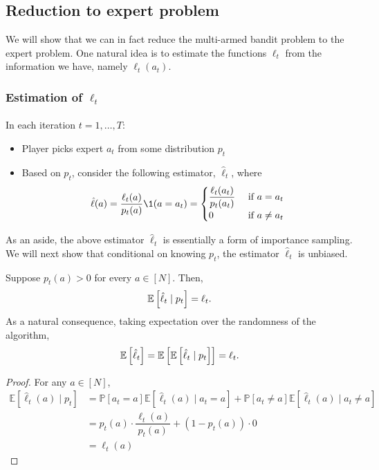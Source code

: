 \documentclass[11pt]{article}
\begin{document}
\subsection{Reduction to expert problem}
We will show that we can in fact reduce the multi-armed bandit problem to the expert problem. One natural idea is to estimate the functions $\ell_t$ from the information we have, namely $\ell_t(a_t)$.

\subsubsection{Estimation of $\ell_t$}
\paragraph{}
In each iteration $t = 1,\dots, T$:
\begin{itemize}
    \item Player picks expert $a_t$ from some distribution $p_t$
    \item Based on $p_t$, consider the following estimator, $\hat{\ell}_t$, where
    \begin{gather*}
        \hat{\ell}(a) = \dfrac{\ell_t(a)}{p_t(a)} \1(a = a_t) = \begin{cases} 
        \dfrac{\ell_t(a_t)}{p_t(a_t)} & \text{ if } a = a_t \\
        0 & \text{ if } a \neq a_t
        \end{cases}
    \end{gather*}
\end{itemize}
As an aside, the above estimator $\hat{\ell}_t$ is essentially a form of importance sampling. We will next show that conditional on knowing $p_t$, the estimator $\hat{\ell}_t$ is unbiased. 
\begin{lemma}\label{lemma 1}
Suppose $p_t(a) > 0$ for every $a \in [N]$. Then,
$$\mathbb{E}\left[\hat{\ell}_t \mid p_t \right]  = \ell_t.$$
As a natural consequence, taking expectation over the randomness of the algorithm,
$$\mathbb{E}\left[\hat{\ell}_t \right] = \mathbb{E} \left[\mathbb{E}\left[\hat{\ell}_t \mid p_t \right]\right] = \ell_t.$$
\end{lemma}
\begin{proof}
For any $a \in [N]$,
\begin{align*}
\mathbb{E} [ \hat{\ell}_t(a) \mid p_t ] &= \mathbb{P} \left[ a_t = a\right] \mathbb{E}\left[\hat{\ell}_t(a) \mid a_t = a \right] + \mathbb{P} \left[a_t \neq a \right] \mathbb{E}\left[\hat{\ell}_t(a) \mid a_t \neq a \right] \\
    &= p_t(a) \cdot \dfrac{\ell_t(a)}{p_t(a)} + (1 - p_t(a)) \cdot 0 \\
    &= \ell_t(a)
\end{align*}
\end{proof}
\end{document}
